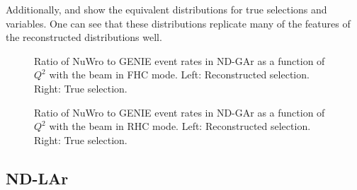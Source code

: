 Additionally,  and  show the equivalent distributions for true selections and variables. 
One can see that these distributions replicate many of the features of the reconstructed distributions well.

\begin{figure}[h]
	\begin{minipage}[t]{.5\linewidth}
		\begin{adjustbox}{max totalsize=\linewidth, center}
			
		\end{adjustbox}
	\end{minipage}
 	\hfill
 	\begin{minipage}[t]{.5\linewidth}
 		\begin{adjustbox}{max totalsize=\linewidth, center}
 			
 		\end{adjustbox}
 	\end{minipage}
 	\caption[Comparison of NuWro and GENIE in $Q^{2}$ for forward horn current]{Ratio of NuWro to GENIE event rates in ND-GAr as a function of $Q^{2}$ with the beam in FHC mode. Left: Reconstructed selection. Right: True selection.}
 	\label{fig:Q2CompFhc}
\end{figure}

\begin{figure}[h]
	\begin{minipage}[t]{.5\linewidth}
		\begin{adjustbox}{max totalsize=\linewidth, center}
			
		\end{adjustbox}
	\end{minipage}
	\hfill
	\begin{minipage}[t]{.5\linewidth}
		\begin{adjustbox}{max totalsize=\linewidth, center}
			
		\end{adjustbox}
	\end{minipage}
	\caption[Comparison of NuWro and GENIE in $Q^{2}$ for reverse horn current]{Ratio of NuWro to GENIE event rates in ND-GAr as a function of $Q^{2}$ with the beam in RHC mode. Left: Reconstructed selection. Right: True selection.}
	\label{fig:Q2CompRhc}
\end{figure}

\subsection{ND-LAr}
\label{sec:dune_ndrwt:pionMulti:lar}

